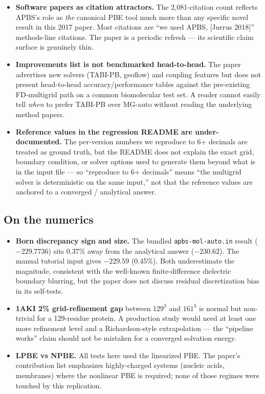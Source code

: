 \documentclass[11pt]{article}
\begin{document}
\begin{itemize}
  \item \textbf{Software papers as citation attractors.} The 2{,}081-citation
        count reflects APBS's role as \emph{the} canonical PBE tool much
        more than any specific novel result in this 2017 paper. Most
        citations are ``we used APBS, [Jurrus 2018]'' methods-line
        citations. The paper is a periodic refresh --- its scientific
        claim surface is genuinely thin.
  \item \textbf{Improvements list is not benchmarked head-to-head.} The
        paper advertises new solvers (TABI-PB, geoflow) and coupling
        features but does not present head-to-head accuracy/performance
        tables against the pre-existing FD-multigrid path on a common
        biomolecular test set. A reader cannot easily tell \emph{when} to
        prefer TABI-PB over MG-auto without reading the underlying
        method papers.
  \item \textbf{Reference values in the regression README are
        under-documented.} The per-version numbers we reproduce to 6+
        decimals are treated as ground truth, but the README does not
        explain the exact grid, boundary condition, or solver options
        used to generate them beyond what is in the input file --- so
        ``reproduce to 6+ decimals'' means ``the multigrid solver is
        deterministic on the same input,'' not that the reference values
        are anchored to a converged / analytical answer.
\end{itemize}

\subsection*{On the numerics}

\begin{itemize}
  \item \textbf{Born discrepancy sign and size.} The bundled
        \texttt{apbs-mol-auto.in} result ($-229.7736$) sits 0.37\% away
        from the analytical answer ($-230.62$). The manual tutorial input
        gives $-229.59$ (0.45\%). Both underestimate the magnitude,
        consistent with the well-known finite-difference dielectric
        boundary blurring, but the paper does not discuss residual
        discretization bias in its self-tests.
  \item \textbf{1AKI 2\% grid-refinement gap} between $129^3$ and $161^3$
        is normal but non-trivial for a 129-residue protein. A production
        study would need at least one more refinement level and a
        Richardson-style extrapolation --- the ``pipeline works'' claim
        should not be mistaken for a converged solvation energy.
  \item \textbf{LPBE vs NPBE.} All tests here used the linearized PBE.
        The paper's contribution list emphasizes highly-charged systems
        (nucleic acids, membranes) where the nonlinear PBE is required;
        none of those regimes were touched by this replication.
\end{itemize}
\end{document}
